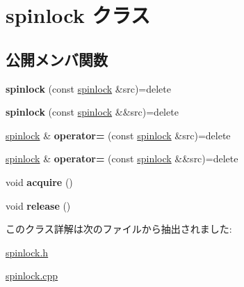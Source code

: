 \hypertarget{classspinlock}{}\section{spinlock クラス}
\label{classspinlock}
\subsection*{公開メンバ関数}
\begin{DoxyCompactItemize}
\item 
\hypertarget{classspinlock_a26da24b614df2de117fcdd14d5c2d85e}{}{\bfseries spinlock} (const \hyperlink{classspinlock}{spinlock} \&src)=delete\label{classspinlock_a26da24b614df2de117fcdd14d5c2d85e}

\item 
\hypertarget{classspinlock_acadc56246fd003d5baf7ffe8f9b1ed23}{}{\bfseries spinlock} (const \hyperlink{classspinlock}{spinlock} \&\&src)=delete\label{classspinlock_acadc56246fd003d5baf7ffe8f9b1ed23}

\item 
\hypertarget{classspinlock_a0770087a012a62147ee94e1d0c6fb083}{}\hyperlink{classspinlock}{spinlock} \& {\bfseries operator=} (const \hyperlink{classspinlock}{spinlock} \&src)=delete\label{classspinlock_a0770087a012a62147ee94e1d0c6fb083}

\item 
\hypertarget{classspinlock_a4a67e0a1797db0dfe37af2ce158a17d0}{}\hyperlink{classspinlock}{spinlock} \& {\bfseries operator=} (const \hyperlink{classspinlock}{spinlock} \&\&src)=delete\label{classspinlock_a4a67e0a1797db0dfe37af2ce158a17d0}

\item 
\hypertarget{classspinlock_af5978d97d07ae5f9e8a4cdc91739cf57}{}void {\bfseries acquire} ()\label{classspinlock_af5978d97d07ae5f9e8a4cdc91739cf57}

\item 
\hypertarget{classspinlock_af1f2e2a0713952b445c8a0754e318c6e}{}void {\bfseries release} ()\label{classspinlock_af1f2e2a0713952b445c8a0754e318c6e}

\end{DoxyCompactItemize}


このクラス詳解は次のファイルから抽出されました\+:\begin{DoxyCompactItemize}
\item 
\hyperlink{spinlock_8h}{spinlock.\+h}\item 
\hyperlink{spinlock_8cpp}{spinlock.\+cpp}\end{DoxyCompactItemize}
